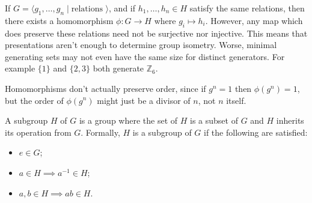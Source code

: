 \begin{corollary}
If $G = \langle g_1,\dotsc,g_n \mid \text{relations } \rangle$, and if $h_1,\dotsc,h_n \in H$ satisfy the same relations, then there exists a homomorphism $\phi : G \to H$ where $g_i \mapsto h_i$. However, any map which does preserve these relations need not be surjective nor injective. This means that presentations aren't enough to determine group isometry. Worse, minimal generating sets may not even have the same size for distinct generators. For example $\{1\}$ and $\{2,3\}$ both generate $\mathbb{Z}_6$.
\end{corollary}

\begin{corollary}
Homomorphisms don't actually preserve order, since if $g^n = 1$ then $\phi(g^n) = 1$, but the order of $\phi(g^n)$ might just be a divisor of $n$, not $n$ itself.
\end{corollary}

\begin{definition}[Subgroup]
A subgroup $H$ of $G$ is a group where the set of $H$ is a subset of $G$
 and $H$ inherits its operation from $G$. Formally, $H$ is a subgroup of $G$ if the following are satisfied:
 \begin{itemize}
 \item $e \in G$;
 \item $a \in H \implies a^{-1} \in H$;
 \item $a,b \in H \implies ab \in H$.
 \end{itemize}
\end{definition}